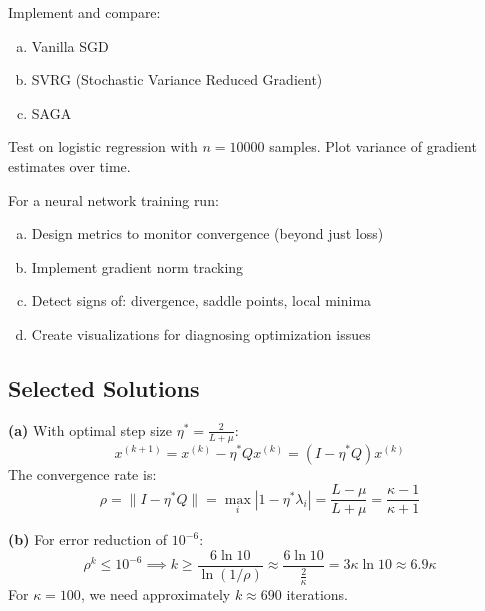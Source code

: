 \documentclass[../main.tex]{subfiles}
\begin{document}
\begin{simpleexercise}
Implement and compare:
\begin{enumerate}[(a)]
    \item Vanilla SGD
    \item SVRG (Stochastic Variance Reduced Gradient)
    \item SAGA
\end{enumerate}
Test on logistic regression with $n = 10000$ samples. Plot variance of gradient estimates over time.
\end{simpleexercise}

\begin{simpleexercise}
For a neural network training run:
\begin{enumerate}[(a)]
    \item Design metrics to monitor convergence (beyond just loss)
    \item Implement gradient norm tracking
    \item Detect signs of: divergence, saddle points, local minima
    \item Create visualizations for diagnosing optimization issues
\end{enumerate}
\end{simpleexercise}

\subsection{Selected Solutions}

\begin{solution}[Exercise 7.1(a,b)]
\textbf{(a)} With optimal step size $\eta^* = \frac{2}{L + \mu}$:
\[
x^{(k+1)} = x^{(k)} - \eta^* Qx^{(k)} = (I - \eta^* Q)x^{(k)}
\]
The convergence rate is:
\[
\rho = \|I - \eta^* Q\| = \max_i |1 - \eta^* \lambda_i| = \frac{L - \mu}{L + \mu} = \frac{\kappa - 1}{\kappa + 1}
\]

\textbf{(b)} For error reduction of $10^{-6}$:
\[
\rho^k \leq 10^{-6} \implies k \geq \frac{6 \ln 10}{\ln(1/\rho)} \approx \frac{6 \ln 10}{\frac{2}{\kappa}} = 3\kappa \ln 10 \approx 6.9\kappa
\]
For $\kappa = 100$, we need approximately $k \approx 690$ iterations.
\end{solution}
\end{document}
